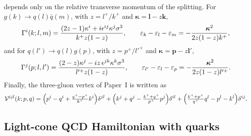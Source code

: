 depends only on the relative transverse momentum of the splitting. For $g(k)\to q(l)\bar q(m)$,
with $z=l^{+}/k^{+}$ and $\bm\kappa=\bm l-z\bm k$,
\begin{equation}
\Gamma^{i}(k;l,m)=\frac{(2z-1)\kappa^{i}+i\epsilon^{ij}\kappa^{j}\sigma^{3}}{k^{+}z(1-z)},
\qquad
\varepsilon_{k}-\varepsilon_{l}-\varepsilon_{m}=-\frac{\bm\kappa^{2}}{2z(1-z)k^{+}} ,
\label{eq:kappa}
\end{equation}
and for $q(l')\to q(l)g(p)$, with $z=p^{+}/l'^{+}$ and $\bm\kappa=\bm p-z\bm l'$,
\begin{equation}
\Gamma^{j}(p;l,l')=\frac{(2-z)\kappa^{j}-iz\,\epsilon^{jk}\kappa^{k}\sigma^{3}}{l'^{+}z(1-z)},
\qquad
\varepsilon_{l'}-\varepsilon_{l}-\varepsilon_{p}=-\frac{\bm\kappa^{2}}{2z(1-z)l'^{+}} .
\label{eq:kappaq}
\end{equation}
Finally, the three-gluon vertex of Paper~I is written as
\begin{equation}
\mathcal{V}^{ijl}(k;p,q)=\Big(p^{i}-q^{i}+\tfrac{q^{+}-p^{+}}{k^{+}}k^{i}\Big)\delta^{jl}
+\Big(k^{j}+q^{j}-\tfrac{k^{+}+q^{+}}{p^{+}}p^{j}\Big)\delta^{il}
+\Big(\tfrac{k^{+}+p^{+}}{q^{+}}q^{l}-p^{l}-k^{l}\Big)\delta^{ij}.
\label{eq:Vggg}
\end{equation}

\subsection{Light-cone QCD Hamiltonian with quarks}
\label{sec:ham}

